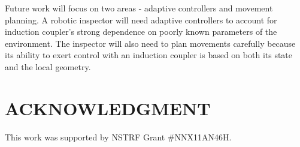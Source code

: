 \documentclass[letterpaper, 10 pt, conference]{ieeeconf}  %
\begin{document}
\par Future work will focus on two areas - adaptive controllers and movement planning. A robotic inspector will need adaptive controllers to account for induction coupler's strong dependence on poorly known parameters of the environment.  The inspector will also need to plan movements carefully because its ability to exert control with an induction coupler is based on both its state and the local geometry.      





   


\addtolength{\textheight}{-12cm}   %








\section*{ACKNOWLEDGMENT}
This work was supported by NSTRF Grant $\#$NNX11AN46H.







\end{document}
